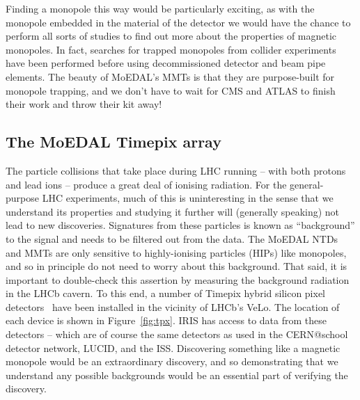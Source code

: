 Finding a monopole this way would be particularly exciting,
as with the monopole embedded in the material of the detector we would 
have the chance to perform all sorts of studies to find out more about the 
properties of magnetic monopoles.  In fact, searches for trapped monopoles 
from collider experiments have been performed before using decommissioned detector 
and beam pipe elements.  The beauty of MoEDAL's \acp{MMT} is that they 
are purpose-built for monopole trapping, and we don't have to wait for \acs{CMS}
and \acs{ATLAS} to finish their work and throw their kit away!

\subsection{The MoEDAL Timepix array}
\label{sec:timepixarray}
The particle collisions that take place during \ac{LHC} running -- with both
protons and lead ions -- produce a great deal of ionising radiation.
For the general-purpose \ac{LHC} experiments,
much of this is uninteresting in the sense that we understand its properties 
and studying it further will (generally speaking) not lead to new discoveries.
Signatures from these particles is known as ``background'' to the signal 
and needs to be filtered out from the data.
The \ac{MoEDAL} \acp{NTD} and \acp{MMT} are only sensitive to highly-ionising 
particles (\acp{HIP}) like monopoles, and so in principle do not need to 
worry about this background.
%
That said, it is important to double-check this assertion by measuring 
the background radiation in the \acs{LHCb} cavern. To this end, a number 
of Timepix hybrid silicon pixel detectors~\cite{Timepix2007, Timepix2008Erratum}
have been installed in the vicinity of \acs{LHCb}'s \acf{VeLo}.
The location of each device is shown in Figure~\ref{fig:tpx}.
\acs{IRIS} has access to data from these detectors -- which are of course the same 
detectors as used in the CERN@school detector network, LUCID, and the 
\acf{ISS}. Discovering something like a magnetic monopole would be an 
extraordinary discovery, and so demonstrating that we understand any possible 
backgrounds would be an essential part of verifying the discovery.

